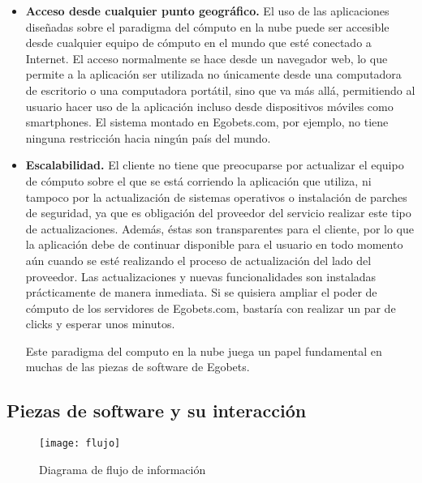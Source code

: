 \begin{itemize}
	\item \textbf{Acceso desde cualquier punto geográfico.} El uso de las aplicaciones diseñadas sobre el paradigma del cómputo en la nube puede ser accesible desde cualquier equipo de cómputo en el mundo que esté conectado a Internet. El acceso normalmente se hace desde un navegador web, lo que permite a la aplicación ser utilizada no únicamente desde una computadora de escritorio o una computadora portátil, sino que va más allá, permitiendo al usuario hacer uso de la aplicación incluso desde dispositivos móviles como smartphones. El sistema montado en Egobets.com, por ejemplo, no tiene ninguna restricción hacia ningún país del mundo.

	\item \textbf{Escalabilidad.} El cliente no tiene que preocuparse por actualizar el equipo de cómputo sobre el que se está corriendo la aplicación que utiliza, ni tampoco por la actualización de sistemas operativos o instalación de parches de seguridad, ya que es obligación del proveedor del servicio realizar este tipo de actualizaciones. Además, éstas son transparentes para el cliente, por lo que la aplicación debe de continuar disponible para el usuario en todo momento aún cuando se esté realizando el proceso de actualización del lado del proveedor. Las actualizaciones y nuevas funcionalidades son instaladas prácticamente de manera inmediata. Si se quisiera ampliar el poder de cómputo de los servidores de Egobets.com, bastaría con realizar un par de clicks y esperar unos minutos.

Este paradigma del computo en la nube juega un papel fundamental en muchas de las piezas de software de Egobets.

\end{itemize}


\subsection{Piezas de software y su interacción}

\begin{figure}[!htb]\centering
   \begin {minipage}{1\textwidth}
     \texttt{[image: flujo]}
     \caption{Diagrama de flujo de información}\label{Fig:flujo}
   \end{minipage}
\end{figure}

